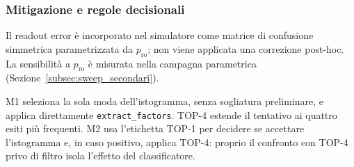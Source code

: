 \begin{onehalfspace}
\subsubsection{Mitigazione e regole decisionali}

Il readout error è incorporato nel simulatore come matrice di confusione simmetrica parametrizzata da $p_{\mathrm{ro}}$; non viene applicata una correzione post-hoc. La sensibilità a $p_{\mathrm{ro}}$ è misurata nella campagna parametrica (Sezione~\ref{subsec:sweep_secondari}).

M1 seleziona la sola moda dell'istogramma, senza sogliatura preliminare, e applica direttamente \texttt{extract\_factors}. TOP-4 estende il tentativo ai quattro esiti più frequenti. M2 usa l'etichetta TOP-1 per decidere se accettare l'istogramma e, in caso positivo, applica TOP-4: proprio il confronto con TOP-4 privo di filtro isola l'effetto del classificatore.

\end{onehalfspace}
